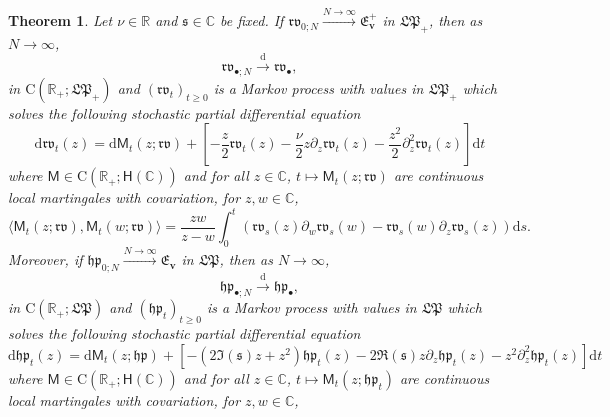 \documentclass[]{article}
\newtheorem{thm}{Theorem}[section]
\begin{document}
\begin{thm}\label{ThmMainStat}
Let $\nu\in \mathbb{R}$ and $\mathfrak{s} \in \mathbb{C}$ be fixed. If $\mathfrak{rv}_{0;N} \overset{N \to \infty}{\longrightarrow} \mathfrak{E}_{\boldsymbol{v}}^+$ in $\mathfrak{LP}_+$, then as $N\to \infty$,
\begin{equation*}
\mathfrak{rv}_{\bullet;N}\overset{\mathrm{d}}{\longrightarrow} \mathfrak{rv}_\bullet,
\end{equation*}
in $\mathrm{C}(\mathbb{R}_+;\mathfrak{LP}_+)$ and  $(\mathfrak{rv}_t)_{t\ge 0}$ is a Markov process with values in $\mathfrak{LP}_+$ which solves the following stochastic partial differential equation 
\begin{equation}\label{RVspde}
\mathrm{d}\mathfrak{rv}_t(z)=\mathrm{d}\mathsf{M}_t(z;\mathfrak{rv})+\left[-\frac{z}{2}\mathfrak{rv}_t(z)-\frac{\nu}{2}z\partial_z\mathfrak{rv}_t(z)
    -
    \frac{z^2}{2}\partial_{z}^2\mathfrak{rv}_t(z)\right]\mathrm{d}t
\end{equation}
where $\mathsf{M}\in \mathrm{C}(\mathbb{R}_+;\mathsf{H}(\mathbb{C}))$ and for all $z\in \mathbb{C}$, $t\mapsto \mathsf{M}_t(z;\mathfrak{rv})$ are  continuous local martingales with covariation, for $z,w \in \mathbb{C}$,
\begin{equation}
\langle \mathsf{M}_t(z;\mathfrak{rv}),\mathsf{M}_t(w;\mathfrak{rv})\rangle=\frac{zw}{z-w}\int_0^t\left(\mathfrak{rv}_s(z)\partial_w\mathfrak{rv}_s(w)-\mathfrak{rv}_s(w)\partial_z\mathfrak{rv}_s(z)\right)\mathrm{d}s.
\end{equation}
Moreover, if $\mathfrak{hp}_{0;N} \overset{N \to \infty}{\longrightarrow} \mathfrak{E}_{\boldsymbol{v}}$ in $\mathfrak{LP}$, then as $N\to \infty$,
\begin{equation*}
\mathfrak{hp}_{\bullet;N}\overset{\mathrm{d}}{\longrightarrow} \mathfrak{hp}_\bullet,
\end{equation*}
in $\mathrm{C}(\mathbb{R}_+;\mathfrak{LP})$ and  $(\mathfrak{hp}_t)_{t\ge 0}$ is a Markov process with values in $\mathfrak{LP}$ which solves the following stochastic partial differential equation 
\begin{equation}\label{HPspde}
\mathrm{d}\mathfrak{hp}_t(z)=\mathrm{d}\mathsf{M}_t(z;\mathfrak{hp})+\left[-(2\Im(\mathfrak{s})z+z^2)\mathfrak{hp}_t(z)-2\Re(\mathfrak{s})z\partial_z\mathfrak{hp}_t(z)-z^2\partial_z^2\mathfrak{hp}_t(z)\right]\mathrm{d}t
\end{equation}
where $\mathsf{M}\in \mathrm{C}(\mathbb{R}_+;\mathsf{H}(\mathbb{C}))$ and for all $z\in \mathbb{C}$, $t\mapsto \mathsf{M}_t(z;\mathfrak{hp}_t)$ are continuous local martingales with covariation, for $z,w \in \mathbb{C}$,

\end{thm}
\end{document}
